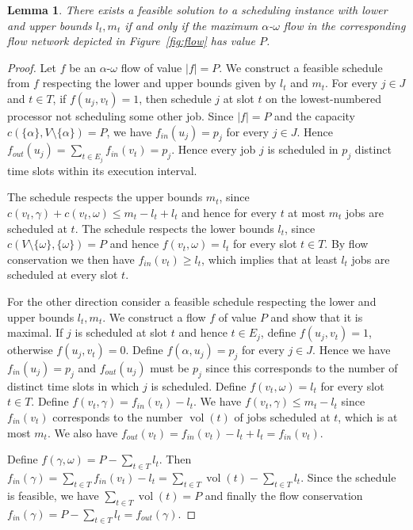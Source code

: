 \documentclass[a4paper]{article}
\DeclareMathOperator{\vol}{vol}
\newtheorem{lemma}[theorem]{Lemma}
\begin{document}
\begin{lemma}\label{lemma:flow_feasibility}
  There exists a feasible solution to a scheduling instance with lower and upper bounds $l_t, m_t$ if and only if the maximum $\alpha$-$\omega$ flow in the corresponding flow network depicted in Figure~\ref{fig:flow} has value $P$.
\end{lemma}
\begin{proof}
  Let $f$ be an $\alpha$-$\omega$ flow of value $|f| = P$.
  We construct a feasible schedule from $f$ respecting the lower and upper bounds given by $l_t$ and $m_t$.
  For every $j \in J$ and  $t \in T$, if $f(u_j, v_t) = 1$, then schedule $j$ at slot $t$ on the lowest-numbered processor not scheduling some other job.
  Since $|f| = P$ and the capacity $c(\{\alpha\}, V \setminus \{\alpha\}) = P$, we have $f_{in}(u_j) = p_j$ for every $j \in J$.
  Hence $f_{out}(u_j) = \sum_{t \in E_j} f_{in}(v_t) = p_j$.
  Hence every job $j$ is scheduled in $p_j$ distinct time slots within its execution interval.

  The schedule respects the upper bounds $m_t$, since $c(v_t, \gamma) + c(v_t, \omega) \leq m_t - l_t + l_t$ and hence for every $t$ at most $m_t$ jobs are scheduled at $t$.
  The schedule respects the lower bounds $l_t$, since
  $c(V \setminus \{\omega\}, \{\omega\}) = P$ and hence
  $f(v_t, \omega) = l_t$ for every slot $t \in T$.
  By flow conservation we then have $f_{in}(v_t) \geq l_t$, which implies that at least $l_t$ jobs are scheduled at every slot $t$.

  For the other direction consider a feasible schedule respecting the lower and upper bounds $l_t, m_t$.
  We construct a flow $f$ of value $P$ and show that it is maximal.
  If $j$ is scheduled at slot $t$ and hence $t \in E_j$,
  define $f(u_j, v_t) = 1$, otherwise $f(u_j, v_t) = 0$.
  Define $f(\alpha, u_j) = p_j$ for every $j \in J$.
  Hence we have $f_{in}(u_j) = p_j$
  and $f_{out}(u_j)$ must be  $p_j$ since this corresponds to the number of distinct time slots in which $j$ is scheduled.
  Define $f(v_t, \omega) = l_t$ for every slot $t \in T$.
  Define $f(v_t, \gamma) = f_{in}(v_t) - l_t$.
  We have $f(v_t, \gamma) \leq m_t - l_t$ since $f_{in}(v_t)$ corresponds to the number $\vol(t)$ of jobs scheduled at $t$, which is at most $m_t$.
  We also have $f_{out}(v_t) = f_{in}(v_t) - l_t + l_t = f_{in}(v_t)$.

  Define $f(\gamma, \omega) = P - \sum_{t \in T} l_t$.
  Then $f_{in}(\gamma) = \sum_{t \in T} f_{in}(v_t) - l_t
  = \sum_{t \in T} \vol(t) - \sum_{t \in T} l_t$.
  Since the schedule is feasible, we have $\sum_{t \in T} \vol(t) = P$ and finally the flow conservation $f_{in}(\gamma) = P - \sum_{t \in T} l_t = f_{out}(\gamma)$.

\end{proof}
\end{document}

